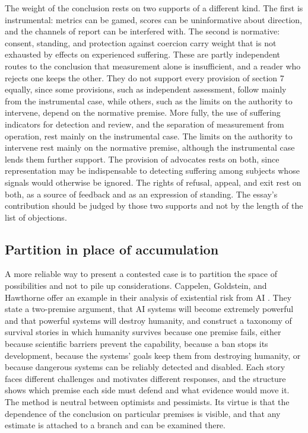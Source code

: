 \documentclass[11pt]{article}
\begin{document}
The weight of the conclusion rests on two supports of a different kind. The first is instrumental: metrics can be gamed, scores can be uninformative about direction, and the channels of report can be interfered with. The second is normative: consent, standing, and protection against coercion carry weight that is not exhausted by effects on experienced suffering. These are partly independent routes to the conclusion that measurement alone is insufficient, and a reader who rejects one keeps the other. They do not support every provision of section 7 equally, since some provisions, such as independent assessment, follow mainly from the instrumental case, while others, such as the limits on the authority to intervene, depend on the normative premise. More fully, the use of suffering indicators for detection and review, and the separation of measurement from operation, rest mainly on the instrumental case. The limits on the authority to intervene rest mainly on the normative premise, although the instrumental case lends them further support. The provision of advocates rests on both, since representation may be indispensable to detecting suffering among subjects whose signals would otherwise be ignored. The rights of refusal, appeal, and exit rest on both, as a source of feedback and as an expression of standing. The essay's contribution should be judged by those two supports and not by the length of the list of objections.

\subsection{Partition in place of accumulation}

A more reliable way to present a contested case is to partition the space of possibilities and not to pile up considerations. Cappelen, Goldstein, and Hawthorne offer an example in their analysis of existential risk from AI \citep{cappelen2025}. They state a two-premise argument, that AI systems will become extremely powerful and that powerful systems will destroy humanity, and construct a taxonomy of survival stories in which humanity survives because one premise fails, either because scientific barriers prevent the capability, because a ban stops its development, because the systems' goals keep them from destroying humanity, or because dangerous systems can be reliably detected and disabled. Each story faces different challenges and motivates different responses, and the structure shows which premise each side must defend and what evidence would move it. The method is neutral between optimists and pessimists. Its virtue is that the dependence of the conclusion on particular premises is visible, and that any estimate is attached to a branch and can be examined there.
\end{document}
